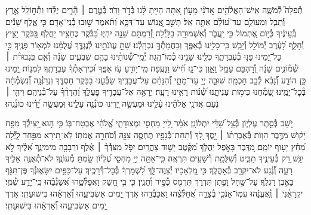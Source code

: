 \documentclass[twoside, openany, parskip=half, 11pt]{book}
\begin{document}
\begin{narrow}
תְּ֯פִלָּה֮ לְ֯מֹשֶׁ֢ה אִֽישׁ־הָאֱלֹ֫הִ֥ים
אֲֽדֹנָ֗י מָע֣וֹן אַ֭תָּה הָיִ֥יתָ לָּ֗נוּ בְּ֯דֹ֣ר וָדֹֽר׃
בְּ֯טֶ֤רֶם ׀ הָ֘רִ֤ים יֻלָּ֗דוּ וַתְּ֯ח֣וֹלֵֽל אֶ֣רֶץ וְ֯תֵבֵ֑ל וּֽמֵעוֹלָ֥ם עַד־ע֝וֹלָ֗ם אַתָּ֥ה אֵֽל׃
תָּשֵׁ֣ב אֱ֭נוֹשׁ עַד־דַּכָּ֑א וַ֝תֹּ֗אמֶר שׁ֣וּבוּ בְ֯נֵֽי־אָדָֽם׃
כִּ֤י אֶ֪לֶף שָׁנִ֡ים בְּֽ֯עֵינֶ֗יךָ כְּ֯י֣וֹם אֶ֭תְמוֹל כִּ֣י יַֽעֲבֹ֑ר וְ֯אַשְׁמוּרָ֥ה בַלָּֽיְ֯לָה׃
זְ֭֯רַמְתָּם שֵׁנָ֣ה יִהְי֑וּ בַּ֝בֹּ֗קֶר כֶּחָצִ֥יר יַחֲלֹֽף׃
בַּ֭בֹּקֶר יָצִ֣יץ וְ֯חָלָ֑ף לָ֝עֶ֗רֶב יְ֯מוֹלֵ֥ל וְ֯יָבֵֽשׁ׃
כִּֽי־כָלִ֥ינוּ בְ֯אַפֶּ֑ךָ וּֽבַחֲמָתְ֯ךָ֥ נִבְהָֽלְ֯נוּ׃
שַׁתָּ֣ עֲוֺנֹתֵ֣ינוּ לְ֯נֶגְדֶּ֑ךָ עֲ֝לֻמֵ֗נוּ לִמְא֥וֹר פָּנֶֽיךָ׃
כִּ֣י כׇל־יָ֭מֵינוּ פָּנ֣וּ בְ֯עֶבְרָתֶ֑ךָ כִּלִּ֖ינוּ שָׁנֵ֣ינוּ כְ֯מוֹ־הֶֽגֶה׃
יְ֯מֵֽי־שְׁ֯נוֹתֵ֨ינוּ בָהֶ֥ם שִׁבְעִ֪ים שָׁנָ֡ה וְ֯אִ֤ם בִּגְבוּרֹ֨ת ׀ שְׁ֯מ֘וֹנִ֤ים שָׁנָ֗ה וְ֭֯רׇהְבָּם עָמָ֣ל וָאָ֑וֶן כִּי־גָ֥ז חִ֗֝ישׁ וַנָּעֻֽפָה׃
מִֽי־י֭וֹדֵעַ עֹ֣ז אַפֶּ֑ךָ וּ֝כְיִרְאָתְ֯ךָ֗ עֶבְרָתֶֽךָ׃
לִמְנ֣וֹת יָ֭מֵינוּ כֵּ֣ן הוֹדַ֑ע וְ֯֝נָבִ֗א לְ֯בַ֣ב חׇכְמָֽה׃
שׁוּבָ֣ה יְיָ֭ עַד־מָתָ֑י וְ֯֝הִנָּחֵ֗ם עַל־עֲבָדֶֽיךָ׃
שַׂבְּ֯עֵ֣נוּ בַבֹּ֣קֶר חַסְדֶּ֑ךָ וּֽנְרַנְּ֯נָ֥ה וְ֯֝נִשְׂמְ֯חָ֗ה בְּ֯כׇל־יָמֵֽינוּ׃
שַׂ֭מְּ֯חֵנוּ כִּימ֣וֹת עִנִּיתָ֑נוּ שְׁ֯֝נ֗וֹת רָאִ֥ינוּ רָעָֽה׃
יֵרָאֶ֣ה אֶל־עֲבָדֶ֣יךָ פׇעֳלֶ֑ךָ וַ֝הֲדָרְ֯ךָ֗ עַל־בְּ֯נֵיהֶֽם׃
וִיהִ֤י ׀ נֹ֤עַם אֲדֹנָ֥י אֱלֹהֵ֗ינוּ עָ֫לֵ֥ינוּ וּמַעֲשֵׂ֣ה יָ֭דֵינוּ כּוֹנְ֯נָ֥ה עָלֵ֑ינוּ וּֽמַעֲשֵׂ֥ה יָ֝דֵ֗ינוּ כּוֹנְ֯נֵֽהוּ׃


יֹ֭שֵׁב בְּ֯סֵ֣תֶר עֶלְי֑וֹן בְּ֯צֵ֥ל שַׁ֝דַּ֗י יִתְלוֹנָֽן׃
אֹמַ֗ר לַ֭ייָ מַחְסִ֣י וּמְצוּדָתִ֑י אֱ֝לֹהַ֗י אֶבְטַח־בּֽוֹ׃
כִּ֤י ה֣וּא יַ֭צִּילְ֯ךָ מִפַּ֥ח יָק֗וּשׁ מִדֶּ֥בֶר הַוּֽוֹת׃
בְּ֯אֶבְרָת֨וֹ ׀ יָ֣סֶךְ לָ֭ךְ וְ֯תַחַת־כְּ֯נָפָ֣יו תֶּחְסֶ֑ה צִנָּ֖ה וְ֯סֹחֵרָ֣ה אֲמִתּֽוֹ׃
לֹֽא־תִ֭ירָא מִפַּ֣חַד לָ֑יְ֯לָה מֵ֝חֵ֗ץ יָע֥וּף יוֹמָֽם׃
מִ֭דֶּבֶר בָּאֹ֣פֶל יַהֲלֹ֑ךְ מִ֝קֶּ֗טֶב יָשׁ֥וּד צׇהֳרָֽיִם׃
יִפֹּ֤ל מִצִּדְּ֯ךָ֨ ׀ אֶ֗לֶף וּרְבָבָ֥ה מִימִינֶ֑ךָ אֵ֝לֶ֗יךָ לֹ֣א יִגָּֽשׁ׃
רַ֭ק בְּ֯עֵינֶ֣יךָ תַבִּ֑יט וְ֯שִׁלֻּמַ֖ת רְ֯שָׁעִ֣ים תִּרְאֶֽה׃
כִּֽי־אַתָּ֣ה יְיָ֣ מַחְסִ֑י עֶ֝לְי֗וֹן שַׂ֣מְתָּ מְ֯עוֹנֶֽךָ׃
לֹא־תְ֯אֻנֶּ֣ה אֵלֶ֣יךָ רָעָ֑ה וְ֯֝נֶ֗גַע לֹא־יִקְרַ֥ב בְּ֯אׇהֳלֶֽךָ׃
כִּ֣י מַ֭לְאָכָיו יְ֯צַוֶּה־לָּ֑ךְ לִ֝שְׁמׇרְךָ֗ בְּ֯כׇל־דְּ֯רָכֶֽיךָ׃
עַל־כַּפַּ֥יִם יִשָּׂא֑וּנְ֯ךָ פֶּן־תִּגֹּ֖ף בָּאֶ֣בֶן רַגְלֶֽךָ׃
עַל־שַׁ֣חַל וָפֶ֣תֶן תִּדְרֹ֑ךְ תִּרְמֹ֖ס כְּ֯פִ֣יר וְ֯תַנִּֽין׃
כִּ֤י בִ֣י חָ֭שַׁק וַאֲפַלְּ֯טֵ֑הוּ אֲ֝שַׂגְּ֯בֵ֗הוּ כִּֽי־יָדַ֥ע שְׁ֯מִֽי׃
יִקְרָאֵ֨נִי ׀ וְֽ֯אֶעֱנֵ֗הוּ עִמּֽוֹ־אָנֹכִ֥י בְ֯צָרָ֑ה אֲ֝חַלְּ֯צֵ֗הוּ וַאֲכַבְּ֯דֵֽהוּ׃
אֹ֣רֶךְ יָ֭מִים אַשְׂבִּיעֵ֑הוּ וְ֯֝אַרְאֵ֗הוּ בִּישׁוּעָתִֽי׃
\scriptsize{אֹ֣רֶךְ יָ֭מִים אַשְׂבִּיעֵ֑הוּ וְ֯֝אַרְאֵ֗הוּ בִּישׁוּעָתִֽי׃ }
\normalsize{}


\end{narrow}
\end{document}
